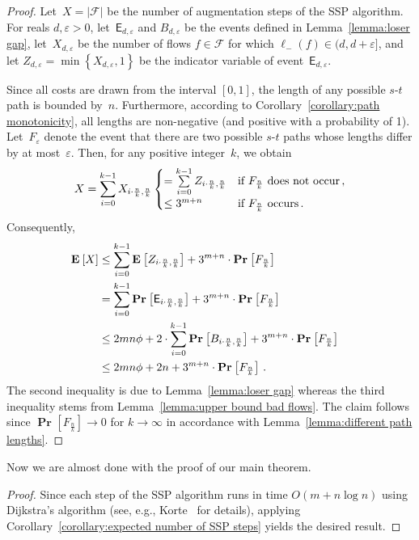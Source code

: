 \documentclass[11pt]{article}
\newcommand{\F}{\mathcal{F}}
\newcommand{\e}{\varepsilon}
\renewcommand{\sp}{\ell}
\newcommand{\event}{\mathsf{E}}
\newcommand{\DOT}{\,.}
\newcommand{\COMMA}{\,,}
\newcommand{\Ex}[2][]{\operatorname{\textbf{E}}_{#1}\left[#2\right]}
\renewcommand{\Pr}[2][]{\operatorname{\textbf{Pr}}_{#1}\left[#2\right]}
\newcommand{\SET}[1]{\left\{#1\right\}}
\newcommand{\spm}[1][]{\sp^{#1}_{-}}
\begin{document}
\begin{proof}
Let~$X = |\F|$ be the number of augmentation steps of the SSP algorithm. For reals $d, \e > 0$, let~$\event_{d, \e}$ and $B_{d, \e}$ be the events defined in Lemma~\ref{lemma:loser gap}, let~$X_{d,\e}$ be the number of flows $f \in \F$ for which $\spm(f) \in (d, d+\e]$, and let $Z_{d, \e} = \min \SET{ X_{d, \e}, 1 }$ be the indicator variable of event~$\event_{d, \e}$.


Since all costs are drawn from the interval $[0, 1]$, the length of any possible $s$-$t$ path is bounded by~$n$. Furthermore, according to Corollary~\ref{corollary:path monotonicity}, all lengths are non-negative (and positive with a probability of 1). Let~$F_\e$ denote the event that there are two possible $s$-$t$ paths whose lengths differ by at most~$\e$. Then, for any positive integer~$k$, we obtain
\[
  X
  = \sum_{i=0}^{k-1} X_{i \cdot \frac{n}{k}, \frac{n}{k}}
  \begin{cases}
    = \sum \limits_{i=0}^{k-1} Z_{i \cdot \frac{n}{k}, \frac{n}{k}} & \text{if $F_{\frac{n}{k}}$ does not occur} \COMMA \cr
    \leq 3^{m+n} & \text{if $F_{\frac{n}{k}}$ occurs} \DOT
  \end{cases}
\]
Consequently,
\begin{align*}
  \Ex{X}
  &\leq \sum_{i=0}^{k-1} \Ex{Z_{i \cdot \frac{n}{k}, \frac{n}{k}}} + 3^{m+n} \cdot \Pr{F_{\frac{n}{k}}} \cr
  &= \sum_{i=0}^{k-1} \Pr{\event_{i \cdot \frac{n}{k}, \frac{n}{k}}} + 3^{m+n} \cdot \Pr{F_{\frac{n}{k}}} \cr
  &\leq 2mn\phi + 2 \cdot \sum_{i=0}^{k-1} \Pr{B_{i \cdot \frac{n}{k}, \frac{n}{k}}} + 3^{m+n} \cdot \Pr{F_{\frac{n}{k}}} \cr
  &\leq 2mn\phi + 2n + 3^{m+n} \cdot \Pr{F_{\frac{n}{k}}} \DOT
\end{align*}
The second inequality is due to Lemma~\ref{lemma:loser gap} whereas the third inequality stems from Lemma~\ref{lemma:upper bound bad flows}. The claim follows since $\Pr{F_{\frac{n}{k}}} \to 0$ for $k \to \infty$ in accordance with Lemma~\ref{lemma:different path lengths}.
\end{proof}

Now we are almost done with the proof of our main theorem.

\begin{proof}
Since each step of the SSP algorithm runs in time $O(m + n \log n)$ using Dijkstra's algorithm (see, e.g.,
Korte~\cite{Korte:2007:COT:1564997} for details), applying Corollary~\ref{corollary:expected number of SSP steps} yields the desired result. \end{proof}
\end{document}
